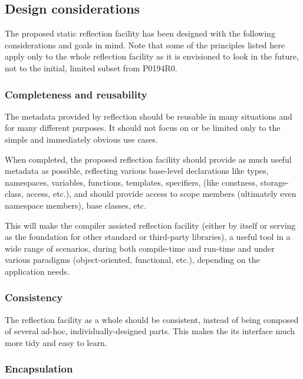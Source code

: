 \subsection{Design considerations}

The proposed static reflection facility has been designed with the following
considerations and goals in mind. 
Note that some of the principles listed here
apply only to the whole reflection facility as it is envisioned
to look in the future, not to the initial, limited subset from P0194R0.

\subsubsection{Completeness and reusability}
\label{design-completeness}

The metadata provided by reflection should be reusable in many situations
and for many different purposes.
It should not focus on or be limited only to the simple and immediately obvious
use cases.

When completed, the proposed reflection facility should provide as much useful
metadata as possible, reflecting various base-level
declarations like types, namespaces, variables, functions, templates, specifiers,
(like constness, storage-class, access, etc.), and should provide access
to scope members (ultimately even namespace members), base classes, etc.

This will make the compiler assisted reflection facility (either by itself or serving
as the foundation for other standard or third-party libraries), a useful tool
in a wide range of scenarios, during both compile-time
and run-time and under various paradigms (object-oriented, functional, etc.),
depending on the application needs.

\subsubsection{Consistency}
\label{design-consistency}

The reflection facility as a whole should be consistent, instead of being
composed of several ad-hoc, individually-designed parts. This makes the
its interface much more tidy and easy to learn.

\subsubsection{Encapsulation}
\label{design-encapsulation}

